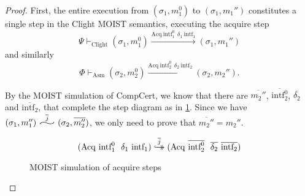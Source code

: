 \begin{proof}
First, the entire execution from $(\sigma_1,m_1^0)$ to $(\sigma_1, m_1'')$ constitutes a single step in the Clight MOIST semantics, executing the acquire step 
\begin{equation}
\Psi \vdash_\mathrm{Clight} 
(\sigma_1,m_1^0)
\xrightarrow{\mathrm{Acq }\ \text{intf}_1^0\   \ \delta_1\ \text{intf}_1 }
(\sigma_1, m_1'')
\end{equation}
and similarly
\begin{equation}\label{eqn:Asmacqstep}
\Phi \vdash_\mathrm{Asm} 
(\sigma_2,m_2^0)
\xrightarrow{\mathrm{Acq }\ \text{intf}_2^0\   \ \delta_2\ \text{intf}_2 }
(\sigma_2, m_2'').
\end{equation}

\noindent By the MOIST simulation of CompCert, we know that there are  $\overline{m_2''}$, $\overline{\text{intf}_2^0}$, $\overline{\delta_2}$ and $\overline{\text{intf}_2}$, that complete the step diagram as in \cref{fig:acqsimdiagram}. Since we have $(\sigma_1, m_1'') \widesim{\overline{j}} (\sigma_2, \overline{m_2''})$, we only need to prove that $\overline{m_2''} = m_2''$.

\begin{figure}
\center
{} 
$$(\mathrm{Acq }\ \text{intf}_1^0\   \ \delta_1\ \text{intf}_1) \strinjarrow{\overline{j}} (\mathrm{Acq }\ \overline{\text{intf}_2^0}\   \ \overline{\delta_2} \ \overline{\text{intf}_2}) $$
\caption{MOIST simulation of acquire steps}\label{fig:acqsimdiagram}
\end{figure}


\end{proof}
